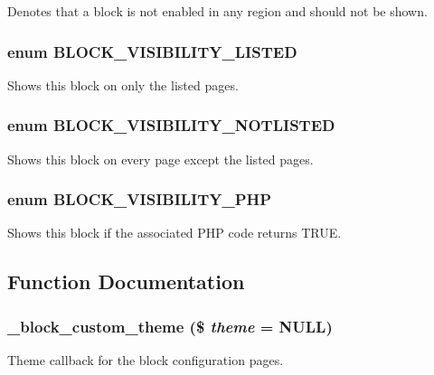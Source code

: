 \label{block_8module_a105ef421c8af1d72830a5a26f8a67169}
Denotes that a block is not enabled in any region and should not be shown. \hypertarget{block_8module_a0e85f795f4b09b01f2c1226806367f4e}{
\subsubsection[{BLOCK\_\-VISIBILITY\_\-LISTED}]{\setlength{\rightskip}{0pt plus 5cm}enum {\bf BLOCK\_\-VISIBILITY\_\-LISTED}}}
\label{block_8module_a0e85f795f4b09b01f2c1226806367f4e}
Shows this block on only the listed pages. \hypertarget{block_8module_a6db179c4e434f3cd58b9b4358a580e7b}{
\subsubsection[{BLOCK\_\-VISIBILITY\_\-NOTLISTED}]{\setlength{\rightskip}{0pt plus 5cm}enum {\bf BLOCK\_\-VISIBILITY\_\-NOTLISTED}}}
\label{block_8module_a6db179c4e434f3cd58b9b4358a580e7b}
Shows this block on every page except the listed pages. \hypertarget{block_8module_a9996a6989c8008bdd8bcc5c0d72ccca5}{
\subsubsection[{BLOCK\_\-VISIBILITY\_\-PHP}]{\setlength{\rightskip}{0pt plus 5cm}enum {\bf BLOCK\_\-VISIBILITY\_\-PHP}}}
\label{block_8module_a9996a6989c8008bdd8bcc5c0d72ccca5}
Shows this block if the associated PHP code returns TRUE. 

\subsection{Function Documentation}
\hypertarget{block_8module_a8386bef2df0ce448d4c5a9d0f5f948e5}{
\subsubsection[{\_\-block\_\-custom\_\-theme}]{\setlength{\rightskip}{0pt plus 5cm}\_\-block\_\-custom\_\-theme (\$ {\em theme} = {\ttfamily NULL})}}
\label{block_8module_a8386bef2df0ce448d4c5a9d0f5f948e5}
Theme callback for the block configuration pages.


